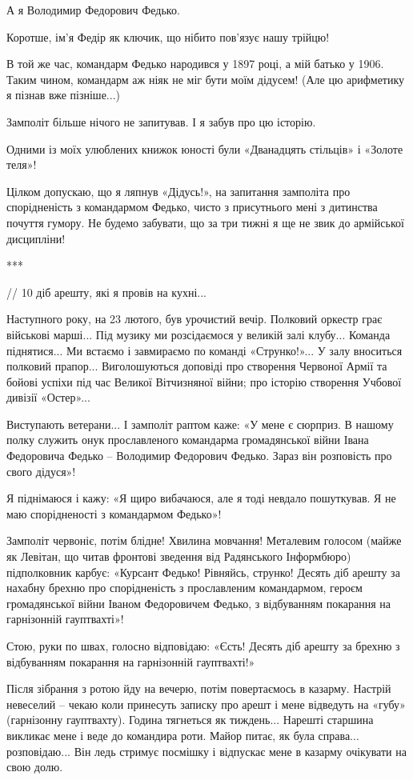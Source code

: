 А я Володимир Федорович Федько.

Коротше, ім’я Федір як ключик, що нібито пов’язує нашу трійцю! 

В той же час, командарм Федько народився у 1897 році, а мій батько у 1906.
Таким чином, командарм аж ніяк не міг бути моїм дідусем! (Але цю арифметику я
пізнав вже пізніше...)

Замполіт більше нічого не запитував. І я забув про цю історію.

Одними із моїх улюблених книжок юності були «Дванадцять стільців» і «Золоте
теля»! 

Цілком допускаю, що я ляпнув «Дідусь!», на запитання замполіта про
спорідненість з командармом Федько, чисто з присутнього мені з дитинства
почуття гумору. Не будемо забувати, що за три тижні я ще не звик до армійської
дисципліни!

***

// 10 діб арешту, які я провів на кухні...

Наступного року, на 23 лютого, був урочистий вечір. Полковий оркестр грає
військові марші... Під музику ми розсідаємося у великій залі клубу... Команда
піднятися... Ми встаємо і завмираємо по команді «Струнко!»... У залу вноситься
полковий прапор... Виголошуються доповіді про створення Червоної Армії та бойові
успіхи під час Великої Вітчизняної війни; про історію створення Учбової дивізії
«Остер»...

Виступають ветерани... І замполіт раптом каже: «У мене є сюрприз. В нашому полку
служить онук прославленого командарма громадянської війни Івана Федоровича
Федько – Володимир Федорович Федько. Зараз він розповість про свого дідуся»!

Я піднімаюся і кажу: «Я щиро вибачаюся, але я тоді невдало пошуткував. Я не маю
спорідненості з командармом Федько»!

Замполіт червоніє, потім блідне! Хвилина мовчання! Металевим голосом (майже як
Левітан, що читав фронтові зведення від Радянського Інформбюро) підполковник
карбує: «Курсант Федько! Рівняйсь, струнко! Десять діб арешту за нахабну брехню
про спорідненість з прославленим командармом, героєм громадянської війни Іваном
Федоровичем Федько, з відбуванням покарання на гарнізонній гауптвахті»!

Стою, руки по швах, голосно відповідаю: «Єсть! Десять діб арешту за брехню з
відбуванням покарання на гарнізонній гауптвахті!»

Після зібрання з ротою йду на вечерю, потім повертаємось в казарму. Настрій
невеселий – чекаю коли принесуть записку про арешт і мене відведуть на «губу»
(гарнізонну гауптвахту). Година тягнеться як тиждень... Нарешті старшина викликає
мене і веде до командира роти. Майор питає, як була справа... розповідаю... Він
ледь стримує посмішку і відпускає мене в казарму очікувати на свою долю.

